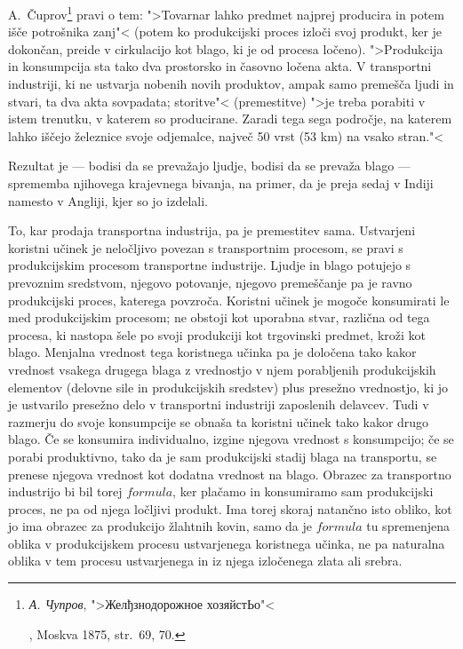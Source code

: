 \documentclass[kapital_02.tex]{subfiles}
\begin{document}
A.~Čuprov\footnote{\begin{otherlanguage}{russian}\emph{А. Чупров}, ">Желђзнодорожное хозяйстЬо"<\end{otherlanguage}, Moskva 1875, str.\ 69, 70.} pravi o tem: ">Tovarnar lahko predmet najprej producira in potem išče potrošnika zanj"< (potem ko produkcijski proces izloči svoj produkt, ker je dokončan, preide v cirkulacijo kot blago, ki je od procesa ločeno). ">Produkcija in konsumpcija sta tako dva prostorsko in časovno ločena akta. V transportni industriji, ki ne ustvarja nobenih novih produktov, ampak samo premešča ljudi in stvari, ta dva akta sovpadata; storitve"< (premestitve) ">je treba porabiti v istem trenutku, v katerem so producirane. Zaradi tega sega področje, na katerem lahko iščejo železnice svoje odjemalce, največ 50 vrst (53 km) na vsako stran."<

Rezultat je --- bodisi da se prevažajo ljudje, bodisi da se prevaža blago --- sprememba njihovega krajevnega bivanja, na primer, da je preja sedaj v Indiji namesto v Angliji, kjer so jo izdelali.

To, kar prodaja transportna industrija, pa je premestitev sama. Ustvarjeni koristni učinek je neločljivo povezan s transportnim procesom, se pravi s produkcijskim procesom transportne industrije. Ljudje in blago potujejo s prevoznim sredstvom, njegovo potovanje, njegovo premeščanje pa je ravno produkcijski proces, katerega povzroča. Koristni učinek je mogoče konsumirati le med produkcijskim procesom; ne obstoji kot uporabna stvar, različna od tega procesa, ki nastopa šele po svoji produkciji kot trgovinski predmet, kroži kot blago. Menjalna vrednost tega koristnega učinka pa je določena tako kakor vrednost vsakega drugega blaga z vrednostjo v njem porabljenih produkcijskih elementov (delovne sile in produkcijskih sredstev) plus presežno vrednostjo, ki jo je ustvarilo presežno delo v transportni industriji zaposlenih delavcev. Tudi v razmerju do svoje konsumpcije se obnaša ta koristni učinek tako kakor drugo blago. Če se konsumira individualno, izgine njegova vrednost s konsumpcijo; če se porabi produktivno, tako da je sam produkcijski stadij blaga na transportu, se prenese njegova vrednost kot dodatna vrednost na blago. Obrazec za transportno industrijo bi bil torej \( formula \), ker plačamo in konsumiramo sam produkcijski proces, ne pa od njega ločljivi produkt. Ima torej skoraj natančno isto obliko, kot jo ima obrazec za produkcijo žlahtnih kovin, samo da je \( formula \) tu spremenjena oblika v produkcijskem procesu ustvarjenega koristnega učinka, ne pa naturalna oblika v tem procesu ustvarjenega in iz njega izločenega zlata ali srebra.
\end{document}
